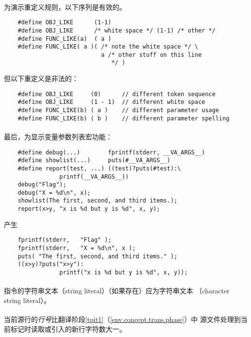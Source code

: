 {\paragraph{}
\ex 为演示重定义规则，以下序列是有效的。
\begin{lstlisting}
    #define OBJ_LIKE      (1-1)
    #define OBJ_LIKE      /* white space */ (1-1) /* other */
    #define FUNC_LIKE(a)  ( a )
    #define FUNC_LIKE( a )( /* note the white space */ \
                            a /* other stuff on this line
                               */ )
\end{lstlisting}
但以下重定义是非法的：
\begin{lstlisting}
    #define OBJ_LIKE     (0)      // different token sequence
    #define OBJ_LIKE     (1 - 1)  // different white space
    #define FUNC_LIKE(b) ( a )    // different parameter usage
    #define FUNC_LIKE(b) ( b )    // different parameter spelling
\end{lstlisting}

\paragraph{}
\ex 最后，为显示变量参数列表宏功能：
\begin{lstlisting}
    #define debug(...)        fprintf(stderr, __VA_ARGS__)
    #define showlist(...)     puts(#__VA_ARGS__)
    #define report(test, ...) ((test)?puts(#test):\
                printf(__VA_ARGS__))
    debug("Flag");
    debug("X = %d\n", x);
    showlist(The first, second, and third items.);
    report(x>y, "x is %d but y is %d", x, y);
\end{lstlisting}
产生
\begin{lstlisting}
    fprintf(stderr,   "Flag" );
    fprintf(stderr,   "X = %d\n", x );
    puts( "The first, second, and third items." );
    ((x>y)?puts("x>y"):
                printf("x is %d but y is %d", x, y));
\end{lstlisting}

\constraint
\paragraph{}
指令的字符串文本（string literal）（如果存在）应为字符串文本
（character string literal）。

\semantic
\paragraph{}
当前源行的\textit{行号}比翻译阶段\ref{tpit1}（\ref{env.concept.trans.phase}）中
源文件处理到当前标记时读取或引入的新行字符数大一。

}
